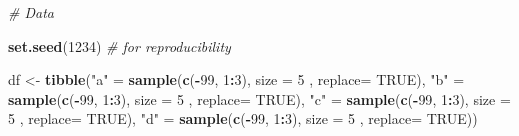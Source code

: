 \documentclass[
]{book}
\newenvironment{Shaded}{\begin{snugshade}}{\end{snugshade}}
\newcommand{\CommentTok}[1]{\textcolor[rgb]{0.56,0.35,0.01}{\textit{#1}}}
\newcommand{\DataTypeTok}[1]{\textcolor[rgb]{0.13,0.29,0.53}{#1}}
\newcommand{\DecValTok}[1]{\textcolor[rgb]{0.00,0.00,0.81}{#1}}
\newcommand{\KeywordTok}[1]{\textcolor[rgb]{0.13,0.29,0.53}{\textbf{#1}}}
\newcommand{\NormalTok}[1]{#1}
\newcommand{\OperatorTok}[1]{\textcolor[rgb]{0.81,0.36,0.00}{\textbf{#1}}}
\newcommand{\OtherTok}[1]{\textcolor[rgb]{0.56,0.35,0.01}{#1}}
\newcommand{\StringTok}[1]{\textcolor[rgb]{0.31,0.60,0.02}{#1}}
\begin{document}
\begin{Shaded}
\begin{Highlighting}[]
\CommentTok{\# Data}

\KeywordTok{set.seed}\NormalTok{(}\DecValTok{1234}\NormalTok{) }\CommentTok{\# for reproducibility }

\NormalTok{df <{-}}\StringTok{ }\KeywordTok{tibble}\NormalTok{(}\StringTok{"a"}\NormalTok{ =}\StringTok{ }\KeywordTok{sample}\NormalTok{(}\KeywordTok{c}\NormalTok{(}\OperatorTok{{-}}\DecValTok{99}\NormalTok{, }\DecValTok{1}\OperatorTok{:}\DecValTok{3}\NormalTok{), }\DataTypeTok{size =} \DecValTok{5}\NormalTok{ , }\DataTypeTok{replace=} \OtherTok{TRUE}\NormalTok{),}
             \StringTok{"b"}\NormalTok{ =}\StringTok{ }\KeywordTok{sample}\NormalTok{(}\KeywordTok{c}\NormalTok{(}\OperatorTok{{-}}\DecValTok{99}\NormalTok{, }\DecValTok{1}\OperatorTok{:}\DecValTok{3}\NormalTok{), }\DataTypeTok{size =} \DecValTok{5}\NormalTok{ , }\DataTypeTok{replace=} \OtherTok{TRUE}\NormalTok{),}
             \StringTok{"c"}\NormalTok{ =}\StringTok{ }\KeywordTok{sample}\NormalTok{(}\KeywordTok{c}\NormalTok{(}\OperatorTok{{-}}\DecValTok{99}\NormalTok{, }\DecValTok{1}\OperatorTok{:}\DecValTok{3}\NormalTok{), }\DataTypeTok{size =} \DecValTok{5}\NormalTok{ , }\DataTypeTok{replace=} \OtherTok{TRUE}\NormalTok{),}
             \StringTok{"d"}\NormalTok{ =}\StringTok{ }\KeywordTok{sample}\NormalTok{(}\KeywordTok{c}\NormalTok{(}\OperatorTok{{-}}\DecValTok{99}\NormalTok{, }\DecValTok{1}\OperatorTok{:}\DecValTok{3}\NormalTok{), }\DataTypeTok{size =} \DecValTok{5}\NormalTok{ , }\DataTypeTok{replace=} \OtherTok{TRUE}\NormalTok{))}
\end{Highlighting}
\end{Shaded}

\begin{Shaded}
\end{Shaded}
\end{document}

